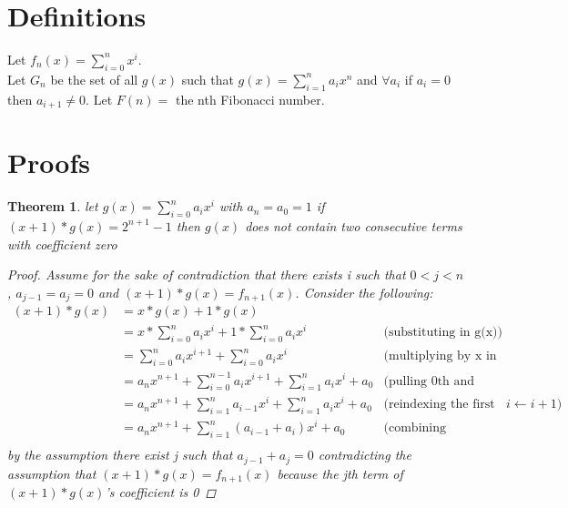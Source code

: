 \documentclass{article}
\title{ }
\newtheorem{theorem}{Theorem}
\begin{document}
	\maketitle
    \section*{Definitions}
    
    Let $f_n(x) = \sum_{i=0}^{n}x^i$.\\
    Let $G_n$ be the set of all $g(x)$ such that $g(x)= \sum_{i=1}^{n} a_i x^n$
        and $\forall a_i$ if $a_i = 0$ then $a_{i+1} \neq 0 $.
    Let $F(n) =$ the nth Fibonacci number.\\
    \section*{Proofs}
    \begin{theorem}
        let $g(x) = \sum_{i=0}^{n} a_i x^i$ with $a_n = a_0 = 1$  
        if $(x+1) * g(x) = 2^{n+1} -1$ 
        then $g(x)$ does not contain two consecutive terms with coefficient zero  
    
        \begin{proof}
            Assume for the sake of contradiction that there exists i 
            such that $0<j<n$,  $a_{j-1} = a_{j} = 0$ and $(x+1)*g(x) =f_{n+1}(x)$.
            Consider the following:
            \begin{align*}
                (x+1)*g(x)  &= x*g(x)+ 1*g(x)\\
                            &= x*\sum_{i=0}^{n} a_i x^i+ 1*\sum_{i=0}^{n} a_i x^i 
                                    &\text{(substituting in g(x))}\\
                            &= \sum_{i=0}^{n} a_i x^{i+1}+ \sum_{i=0}^{n} a_i x^i
                                    &\text{(multiplying by x in summation)}\\
                            &= a_nx^{n+1}+\sum_{i=0}^{n-1} a_i x^{i+1}+ \sum_{i=1}^{n} a_i x^i+ a_0
                                    &\text{(pulling 0th and (n+1)th terms out of the summation)}\\
                            &= a_nx^{n+1}+\sum_{i=1}^{n} a_{i-1} x^{i}+ \sum_{i=1}^{n} a_i x^i+ a_0
                                    &\text{(reindexing the first sum $i \leftarrow i+1$)}\\
                            &=a_nx^{n+1}+\sum_{i=1}^{n} (a_{i-1} + a_i) x^i+ a_0
                                    &\text{(combining summations)}\\
            \end{align*}
            by the assumption there exist j such that $a_{j-1} + a_{j} = 0$ 
            contradicting the assumption that $(x+1)*g(x) =f_{n+1}(x)$ because the jth term of $(x+1)*g(x)$'s coefficient  is 0  
        \end{proof}
    \end{theorem}
\end{document}
